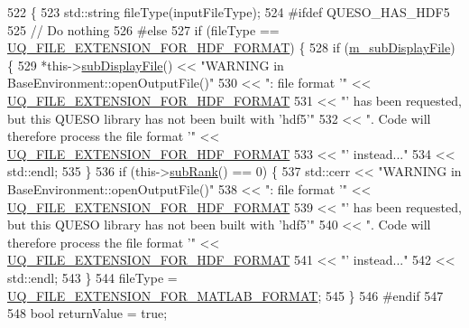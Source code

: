 \begin{DoxyCode}
522 \{
523   std::string fileType(inputFileType);
524 \textcolor{preprocessor}{#ifdef QUESO\_HAS\_HDF5}
525 \textcolor{preprocessor}{}  \textcolor{comment}{// Do nothing}
526 \textcolor{preprocessor}{#else}
527 \textcolor{preprocessor}{}  \textcolor{keywordflow}{if} (fileType == \hyperlink{_defines_8h_a4ebcc075277d031eb97c90b9a45f4493}{UQ\_FILE\_EXTENSION\_FOR\_HDF\_FORMAT}) \{
528     \textcolor{keywordflow}{if} (\hyperlink{class_q_u_e_s_o_1_1_base_environment_a52b4275aa8ee85994dd304d9fe95c9c5}{m\_subDisplayFile}) \{
529       *this->\hyperlink{class_q_u_e_s_o_1_1_base_environment_a8a0064746ae8dddfece4229b9ad374d6}{subDisplayFile}() << \textcolor{stringliteral}{"WARNING in BaseEnvironment::openOutputFile()"}
530                               << \textcolor{stringliteral}{": file format '"} << 
      \hyperlink{_defines_8h_a4ebcc075277d031eb97c90b9a45f4493}{UQ\_FILE\_EXTENSION\_FOR\_HDF\_FORMAT}
531                               << \textcolor{stringliteral}{"' has been requested, but this QUESO library has not been built with
       'hdf5'"}
532                               << \textcolor{stringliteral}{". Code will therefore process the file format '"} << 
      \hyperlink{_defines_8h_a4ebcc075277d031eb97c90b9a45f4493}{UQ\_FILE\_EXTENSION\_FOR\_HDF\_FORMAT}
533                               << \textcolor{stringliteral}{"' instead..."}
534                               << std::endl;
535     \}
536     \textcolor{keywordflow}{if} (this->\hyperlink{class_q_u_e_s_o_1_1_base_environment_a172d52f993f1322ed45aaddf71518dbb}{subRank}() == 0) \{
537       std::cerr << \textcolor{stringliteral}{"WARNING in BaseEnvironment::openOutputFile()"}
538                 << \textcolor{stringliteral}{": file format '"} << \hyperlink{_defines_8h_a4ebcc075277d031eb97c90b9a45f4493}{UQ\_FILE\_EXTENSION\_FOR\_HDF\_FORMAT}
539                 << \textcolor{stringliteral}{"' has been requested, but this QUESO library has not been built with 'hdf5'"}
540                 << \textcolor{stringliteral}{". Code will therefore process the file format '"} << 
      \hyperlink{_defines_8h_a4ebcc075277d031eb97c90b9a45f4493}{UQ\_FILE\_EXTENSION\_FOR\_HDF\_FORMAT}
541                 << \textcolor{stringliteral}{"' instead..."}
542                 << std::endl;
543     \}
544     fileType = \hyperlink{_defines_8h_ac440026eff7deb1c1eed1eea0e8e36ba}{UQ\_FILE\_EXTENSION\_FOR\_MATLAB\_FORMAT};
545   \}
546 \textcolor{preprocessor}{#endif}
547 \textcolor{preprocessor}{}
548   \textcolor{keywordtype}{bool} returnValue = \textcolor{keyword}{true};

\end{DoxyCode}

